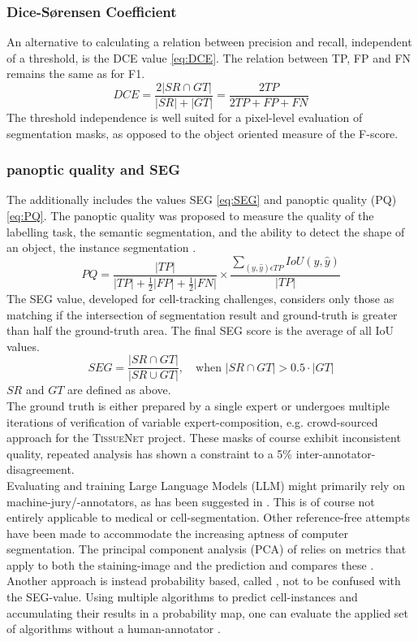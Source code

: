 \subsubsection*{Dice-Sørensen Coefficient}
An alternative to calculating a relation between precision and recall, independent of a threshold, is the DCE value \eqref{eq:DCE}. The relation between TP, FP and FN remains the same as for F1. 
\begin{equation}
\label{eq:DCE}
    DCE = \frac{2|SR\cap GT|}{|SR|+|GT|} = \frac{2TP}{2TP+FP+FN}
\end{equation}
The threshold independence is well suited for a pixel-level evaluation of segmentation masks, as opposed to the object oriented measure of the F-score.
\subsubsection*{panoptic quality and SEG}
The  additionally includes the values SEG \eqref{eq:SEG} and panoptic quality (PQ) \eqref{eq:PQ}. The panoptic quality was proposed to measure the quality of the labelling task, the semantic segmentation, and the ability to detect the shape of an object, the instance segmentation \cite{kirillov_segment_2023}. 
\begin{equation}
\label{eq:PQ}
    PQ = \frac{|TP|}{|TP| + \frac{1}{2}|FP| + \frac{1}{2}|FN|} \times \frac{\sum_{(y,\hat y)\epsilon TP}IoU(y, \hat y)}{|TP|}
\end{equation}
The SEG value, developed for cell-tracking challenges, considers only those as matching if the intersection of segmentation result and ground-truth is greater than half the ground-truth area. The final SEG score is the average of all IoU values\cite{maska_benchmark_2014}.
\begin{equation}
\label{eq:SEG}
    SEG = \frac{|SR \cap GT|}{|SR\cup GT|},\quad \text{when }|SR \cap GT| > 0.5\cdot|GT|
\end{equation}
$SR$ and $GT$ are defined as above.
\\
The ground truth is either prepared by a single expert or undergoes multiple iterations of verification of variable expert-composition, e.g. crowd-sourced approach for the \textsc{TissueNet} project. These masks of course exhibit inconsistent quality, repeated analysis has shown a constraint to a 5\% inter-annotator-disagreement. \\
Evaluating and training Large Language Models (LLM) might primarily rely on machine-jury/-annotators, as has been suggested in \cite{calderon_alternative_2025}. This is of course not entirely applicable to medical or cell-segmentation. Other reference-free attempts have been made to accommodate the increasing aptness of computer segmentation. The principal component analysis (PCA) of  relies on metrics that apply to both the staining-image and the prediction and compares these \cite{chen_evaluation_2023}. Another approach is instead probability based, called , not to be confused with the SEG-value. Using multiple algorithms to predict cell-instances and accumulating their results in a probability map, one can evaluate the applied set of algorithms without a human-annotator \cite{sims_seg_2023}.\\